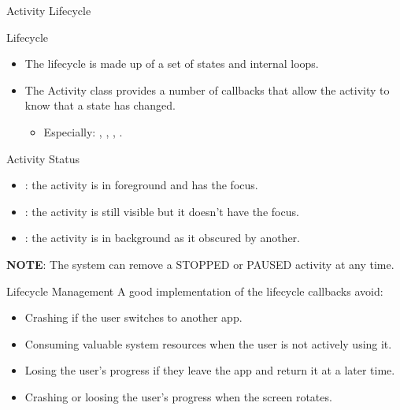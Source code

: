 \documentclass{beamer}
\begin{document}
\begin{frame}{Activity Lifecycle}
  \begin{block}{Lifecycle}
    \begin{itemize}
      \item The lifecycle is made up of a set of states and internal loops.
      \item The Activity class provides a number of callbacks that allow the activity to know that a state has changed.
      \begin{itemize}
        \item Especially: , , , .
      \end{itemize}
    \end{itemize}
  \end{block}

  \begin{block}{Activity Status}
    \begin{itemize}
      \item {}: the activity is in foreground and has the focus.
      \item {}: the activity is still visible but it doesn't have the focus.
      \item {}: the activity is in background as it obscured by another.
    \end{itemize}
  \end{block}

  {\small \textbf{NOTE}: The system can remove a STOPPED or PAUSED activity at any time.}

  \begin{block}{Lifecycle Management}
    A good implementation of the lifecycle callbacks avoid:
    \begin{itemize}
      \item Crashing if the user switches to another app.
      \item Consuming valuable system resources when the user is not actively using it.
      \item Losing the user's progress if they leave the app and return it at a later time.
      \item Crashing or loosing the user's progress when the screen rotates.
    \end{itemize}
  \end{block}


\end{frame}
\end{document}
